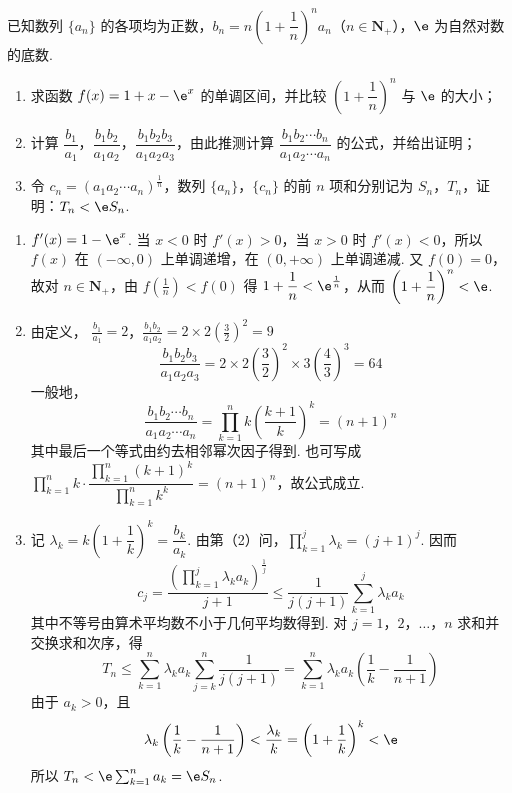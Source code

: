 \begin{problem}
已知数列 \(\{a_n\}\) 的各项均为正数，\(b_n=n\left(1+\dfrac1n\right)^n a_n\)（\(n\in\mathbf{N}_+\)），\(\e\) 为自然对数的底数.

\begin{enumerate}
\item 求函数 \(f(x)=1+x-\e^x\) 的单调区间，并比较 \(\left(1+\dfrac1n\right)^n\) 与 \(\e\) 的大小；
\item 计算 \(\dfrac{b_1}{a_1}\)，\(\dfrac{b_1b_2}{a_1a_2}\)，\(\dfrac{b_1b_2b_3}{a_1a_2a_3}\)，由此推测计算 \(\dfrac{b_1b_2\cdots b_n}{a_1a_2\cdots a_n}\) 的公式，并给出证明；
\item 令 \(c_n=(a_1a_2\cdots a_n)^{\frac1n}\)，数列 \(\{a_n\}\)，\(\{c_n\}\) 的前 \(n\) 项和分别记为 \(S_n\)，\(T_n\)，证明：\(T_n<\e S_n\).
\end{enumerate}
\end{problem}

\begin{solution}
\begin{enumerate}
\item \(f'(x)=1-\e^x\). 当 \(x<0\) 时 \(f'(x)>0\)，当 \(x>0\) 时 \(f'(x)<0\)，所以 \(f(x)\) 在 \((-\infty,0)\) 上单调递增，在 \((0,+\infty)\) 上单调递减. 又 \(f(0)=0\)，故对 \(n\in\mathbf N_+\)，由 \(f(\frac{1}{n})<f(0)\) 得 \(1+\dfrac1n<\e^{\frac{1}{n}}\)，从而 \(\left(1+\dfrac1n\right)^n<\e\).

\item 由定义，
\(\frac{b_1}{a_1}=2\)，\(\frac{b_1b_2}{a_1a_2}=2\times2\left(\frac32\right)^2=9\)
\[
\frac{b_1b_2b_3}{a_1a_2a_3}=2\times2\left(\frac32\right)^2\times3\left(\frac43\right)^3=64
\]
一般地，
\[
\frac{b_1b_2\cdots b_n}{a_1a_2\cdots a_n}
=\prod_{k=1}^n k\left(\frac{k+1}{k}\right)^k=(n+1)^n
\]
其中最后一个等式由约去相邻幂次因子得到. 也可写成
\(\prod_{k=1}^n k\cdot\dfrac{\prod_{k=1}^n(k+1)^k}{\prod_{k=1}^n k^k}=(n+1)^n\)，故公式成立.

\item 记 \(\lambda_k=k\left(1+\dfrac1k\right)^k=\dfrac{b_k}{a_k}\). 由第（2）问，\(\prod_{k=1}^j\lambda_k=(j+1)^j\). 因而
\[
c_j=\frac{\left(\prod_{k=1}^j\lambda_k a_k\right)^{\frac{1}{j}}}{j+1}
\leqslant\frac{1}{j(j+1)}\sum_{k=1}^j\lambda_k a_k
\]
其中不等号由算术平均数不小于几何平均数得到. 对 \(j=1\)，\(2\)，\(\ldots\)，\(n\) 求和并交换求和次序，得
\[
T_n\leqslant\sum_{k=1}^n\lambda_k a_k\sum_{j=k}^n\frac1{j(j+1)}
=\sum_{k=1}^n\lambda_k a_k\left(\frac1k-\frac1{n+1}\right)
\]
由于 \(a_k>0\)，且
\[
\lambda_k\left(\frac1k-\frac1{n+1}\right)<\frac{\lambda_k}{k}=\left(1+\frac1k\right)^k<\e
\]
所以
\(T_n<\e\sum_{k=1}^n a_k=\e S_n\).
\end{enumerate}
\end{solution}
